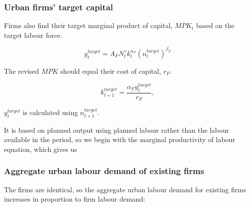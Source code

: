 

\subsubsection{Urban firms' target capital} 

Firms also find their target marginal product of capital, $MPK_t$ based on the target labour force. 

\begin{equation}
    {y}_t^{target}=A_FN_t^\gamma k_t^{\alpha_F} (n_t^{target})^{\beta_F} \label{eqn-urban-firm-output}
\end{equation}


The revised $MPK$ should equal their cost of capital, $r_F$. %

\begin{equation}k_{t+1}^{target}= \frac{\alpha_{F}{y}^{target}_{t}}{r_F},\end{equation}



 $y_t^{target}$  is calculated using $n^{target}_{t+1}$. %

It is based on planned output using planned labour rather than the labour available in the period, so we begin with the marginal productivity of labour equation, 
which gives us 



\subsubsection{Aggregate urban labour demand of existing firms} 

The firms are identical, so the aggregate urban labour demand for existing firms increases in proportion to firm labour demand:

